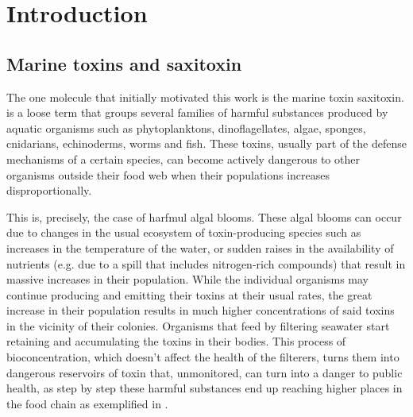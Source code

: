 \chapter{Introduction}


\section{Marine toxins and saxitoxin}

The one molecule that initially motivated this work is the marine toxin saxitoxin.
 is a loose term that groups several families of harmful substances produced by aquatic organisms such as phytoplanktons, dinoflagellates, algae, sponges, cnidarians, echinoderms, worms and fish.
These toxins, usually part of the defense mechanisms of a certain species, can become actively dangerous to other organisms outside their food web when their populations increases disproportionally.

This is, precisely, the case of harfmul algal blooms.
These algal blooms can occur due to changes in the usual ecosystem of toxin-producing species such as increases in the temperature of the water, or sudden raises in the availability of nutrients (e.g. due to a spill that includes nitrogen-rich compounds) that result in massive increases in their population.\cite{michalak13,chakraborty10,gobler17}
While the individual organisms may continue producing and emitting their toxins at their usual rates, the great increase in their population results in much higher concentrations of said toxins in the vicinity of their colonies.
Organisms that feed by filtering seawater start retaining and accumulating the toxins in their bodies.\cite{oikawa05}
This process of bioconcentration, which doesn't affect the health of the filterers, turns them into dangerous reservoirs of toxin that, unmonitored, can turn into a danger to public health, as step by step these harmful substances end up reaching higher places in the food chain as exemplified in .

